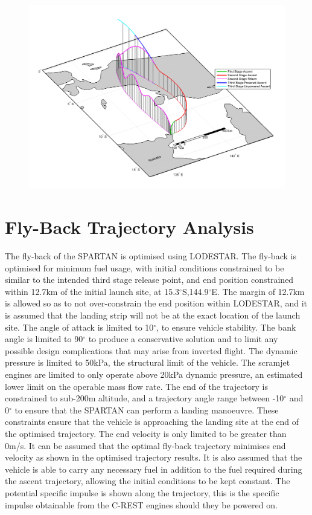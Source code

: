 \begin{figure}
\centering
\includegraphics[width=1\linewidth]{figures/6_FlyBack/mode1/GroundTrackStandard}
\caption{}
\label{fig:GroundTrackStandard}
\end{figure}


\section{Fly-Back Trajectory Analysis}
The fly-back of the SPARTAN is optimised using LODESTAR. The fly-back is optimised for minimum fuel usage, with initial conditions constrained to be similar to the intended third stage release point, and end position constrained within 12.7km of the initial launch site, at  15.3$^\circ$S,144.9$^\circ$E\cite{ForbesSpyratos2018}. The margin of 12.7km is allowed so as to not over-constrain the end position within LODESTAR, and it is assumed that the landing strip will not be at the exact location of the launch site. The angle of attack is limited to 10$^\circ$, to ensure vehicle stability. The bank angle is limited to 90$^\circ$ to produce a conservative solution and to limit any possible design complications that may arise from inverted flight. The dynamic pressure is limited to 50kPa, the structural limit of the vehicle. The scramjet engines are limited to only operate above 20kPa dynamic pressure, an estimated lower limit on the operable mass flow rate.
The end of the trajectory is constrained to sub-200m altitude, and a trajectory angle range between -10$^\circ$ and 0$^\circ$ to ensure that the SPARTAN can perform a landing manoeuvre. These constraints ensure that the vehicle is approaching the landing site at the end of the optimised trajectory. The end velocity is only limited to be greater than 0m/s. It can be assumed that the optimal fly-back trajectory minimises end velocity as shown in the optimised trajectory results. 
It is also assumed that the vehicle is able to carry any necessary fuel in addition to the fuel required during the ascent trajectory, allowing the initial conditions to be kept constant. The potential specific impulse is shown along the trajectory, this is the specific impulse obtainable from the C-REST engines should they be powered on.

